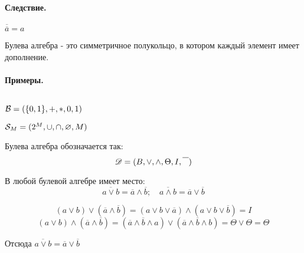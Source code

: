 \paragraph*{Следствие.}
$\overline{\overline{a}} = a$

\begin{definition}
Булева алгебра - это симметричное полукольцо, в котором каждый элемент имеет дополнение.
\end{definition}

\paragraph*{Примеры.} ${}$ \newline

${\cal B} = (\{0,1\}, +, *, 0, 1 )$ 

${\cal S}_M = (2^{M}, \cup, \cap, \varnothing, M)$

\medskip

Булева алгебра обозначается так:
\[
    \mathscr{D} = (B, \lor, \land, \Theta, I, \overline{\phantom{A}})
\] 

\begin{theorem}
В любой булевой алгебре имеет место:
\[
\overline{a \lor b} = \overline{a} \land \overline{b}; \quad
\overline{a \land b} = \overline{a} \lor \overline{b}
\]
\end{theorem}
\begin{myproof}
    \[
        (a \lor b) \lor (\overline{a} \land \overline{b}) = (a \lor b \lor \overline{a}) \land
        (a \lor b \lor \overline{b}) = I
    \]
    \[
        (a \lor b) \land (\overline{a} \land \overline{b}) = (\overline{a} \land \overline{b}
        \land a) \lor (\overline{a} \land \overline{b} \land b) = \Theta \lor \Theta = \Theta
    \] 

    Отсюда $\overline{a \lor b} = \overline{a} \lor \overline{b}$
\end{myproof}



